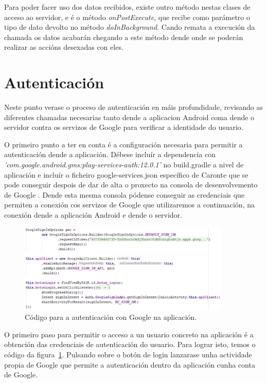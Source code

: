 Para poder facer uso dos datos recibidos, existe outro método nestas clases de acceso ao servidor, e é o método \emph{onPostExecute}, que recibe como parámetro o tipo de dato devolto no método \emph{doInBackground}. Cando remata a execución da chamada os datos acabarán chegando a este método dende onde se poderán realizar as accións desexadas con eles.


\section{Autenticación}
Neste punto verase o proceso de autenticación en máis profundidade, revisando as diferentes chamadas necesarias tanto dende a aplicacion Android coma dende o servidor contra os servizos de Google para verificar a identidade do usuario.

O primeiro punto a ter en conta é a configuración necesaria para permitir a autenticación dende a aplicación. Débese incluír a dependencia con \emph{'com.google.android.gms:play-services-auth:12.0.1'} no build.gradle a nivel de aplicación e incluír o ficheiro google-services.json específico de Caronte que se pode conseguir despois de dar de alta o proxecto na consola de desenvolvemento de Google \cite{consolaDesenvolvedorGoogle}. Dende esta mesma consola pódense conseguir as credenciais que permiten a conexión cos servizos de Google que utilizaremos a continuación, na conexión dende a aplicación Android e dende o servidor.


\begin{figure}[htb] 
	\begin{center}
		\includegraphics[width=0.9\textwidth]{figures/codigo/autenticacionGoogleInicio}
		\caption{Código para a autenticación con Google na aplicación.}
		\label{fig:autenticacionGoogleInicio}
	\end{center}
\end{figure}

O primeiro paso para permitir o acceso a un usuario concreto na aplicación é a obtención das credenciais de autenticación do usuario. Para lograr isto, temos o código da figura~\ref{fig:autenticacionGoogleInicio}. Pulsando sobre o botón de login lanzarase unha actividade propia de Google que permite a autenticación dentro da aplicación cunha conta de Google.

